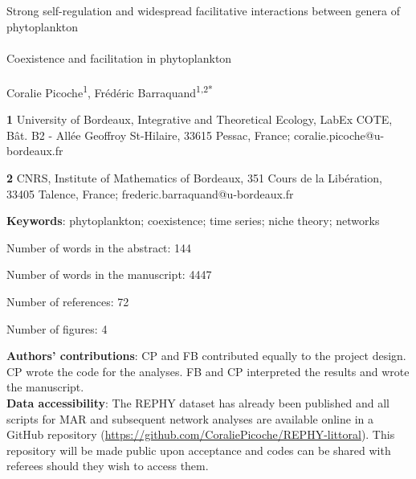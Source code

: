 \documentclass[10pt]{article}
\begin{document}
\thispagestyle{empty}
\vspace*{0.2in}


{\Large{}{Strong self-regulation and widespread facilitative interactions
between genera of phytoplankton} %
} \\
\bigskip{}
\textbf{\large{}}\\
{\large{}{Coexistence and facilitation in phytoplankton} %
} %
\\
\\
 \bigskip{}
Coralie Picoche\textsuperscript{1}, Frédéric Barraquand\textsuperscript{1,2{*}}
\\
 \bigskip{}

\textbf{1} University of Bordeaux, Integrative and Theoretical Ecology,
LabEx COTE, Bât. B2 - Allée Geoffroy St-Hilaire, 33615 Pessac, France;
coralie.picoche@u-bordeaux.fr

\textbf{2} CNRS, Institute of Mathematics of Bordeaux, 351 Cours de
la Libération, 33405 Talence, France; frederic.barraquand@u-bordeaux.fr
\\

\bigskip{}

\textbf{Keywords}: phytoplankton; coexistence; time series; niche
theory; networks

\bigskip{}
Number of words in the abstract: 144

Number of words in the manuscript: 4447

Number of references: 72

Number of figures: 4 \bigskip{}

\textbf{Authors' contributions}: CP and FB contributed equally to
the project design. CP wrote the code for the analyses. FB and CP
interpreted the results and wrote the manuscript.\\

\textbf{Data accessibility}: The REPHY dataset has already been published
\citep{REPHY_db} and all scripts for MAR and subsequent network analyses
are available online in a GitHub repository (\url{https://github.com/CoraliePicoche/REPHY-littoral}).
This repository will be made public upon acceptance and codes can
be shared with referees should they wish to access them.
\end{document}
